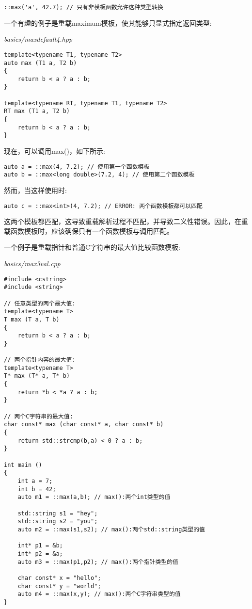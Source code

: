 \begin{lstlisting}[style=styleCXX]
::max('a', 42.7); // 只有非模板函数允许这种类型转换
\end{lstlisting}

一个有趣的例子是重载maximum模板，使其能够只显式指定返回类型:

\noindent
\textit{basics/maxdefault4.hpp}
\begin{lstlisting}[style=styleCXX]
template<typename T1, typename T2>
auto max (T1 a, T2 b)
{
	return b < a ? a : b;
}

template<typename RT, typename T1, typename T2>
RT max (T1 a, T2 b)
{
	return b < a ? a : b;
}
\end{lstlisting}

现在，可以调用max()，如下所示:

\begin{lstlisting}[style=styleCXX]
auto a = ::max(4, 7.2); // 使用第一个函数模板
auto b = ::max<long double>(7.2, 4); // 使用第二个函数模板
\end{lstlisting}

然而，当这样使用时:

\begin{lstlisting}[style=styleCXX]
auto c = ::max<int>(4, 7.2); // ERROR: 两个函数模板都可以匹配
\end{lstlisting}

这两个模板都匹配，这导致重载解析过程不匹配，并导致二义性错误。因此，在重载函数模板时，应该确保只有一个函数模板与调用匹配。

一个例子是重载指针和普通C字符串的最大值比较函数模板:

\noindent
\textit{basics/max3val.cpp}
\begin{lstlisting}[style=styleCXX]
#include <cstring>
#include <string>

// 任意类型的两个最大值:
template<typename T>
T max (T a, T b)
{
	return b < a ? a : b;
}

// 两个指针内容的最大值:
template<typename T>
T* max (T* a, T* b)
{
	return *b < *a ? a : b;
}

// 两个C字符串的最大值:
char const* max (char const* a, char const* b)
{
	return std::strcmp(b,a) < 0 ? a : b;
}

int main ()
{
	int a = 7;
	int b = 42;
	auto m1 = ::max(a,b); // max():两个int类型的值
	
	std::string s1 = "hey";
	std::string s2 = "you";
	auto m2 = ::max(s1,s2); // max():两个std::string类型的值
	
	int* p1 = &b;
	int* p2 = &a;
	auto m3 = ::max(p1,p2); // max():两个指针类型的值
	
	char const* x = "hello";
	char const* y = "world";
	auto m4 = ::max(x,y); // max():两个C字符串类型的值
}
\end{lstlisting}

